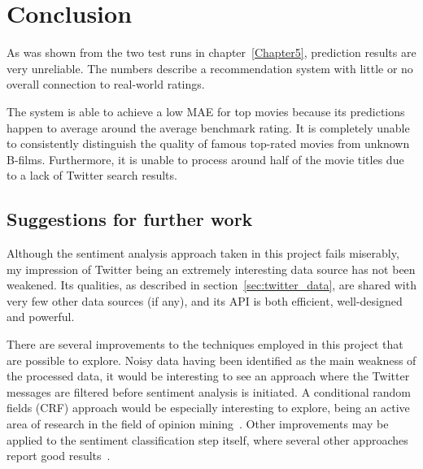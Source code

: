 
\chapter{Conclusion} %

\label{Chapter6}




As was shown from the two test runs in chapter~\ref{Chapter5}, prediction results are very unreliable. The numbers describe a recommendation system with little or no overall connection to real-world ratings.

The system is able to achieve a low MAE for top movies because its predictions happen to average around the average benchmark rating. It is completely unable to consistently distinguish the quality of famous top-rated movies from unknown B-films. Furthermore, it is unable to process around half of the movie titles due to a lack of Twitter search results.

\section{Suggestions for further work} %
\label{sec:suggestions_for_further_work}

Although the sentiment analysis approach taken in this project fails miserably, my impression of Twitter being an extremely interesting data source has not been weakened. Its qualities, as described in section~\ref{sec:twitter_data}, are shared with very few other data sources (if any), and its API is both efficient, well-designed and powerful.

There are several improvements to the techniques employed in this project that are possible to explore. Noisy data having been identified as the main weakness of the processed data, it would be interesting to see an approach where the Twitter messages are filtered before sentiment analysis is initiated. A conditional random fields (CRF) approach would be especially interesting to explore, being an active area of research in the field of opinion mining~\cite{Choi:2005:ISO:1220575.1220620, Jakob:2010:EOT:1870658.1870759, Yang:2012:EOE:2390948.2391100}. Other improvements may be applied to the sentiment classification step itself, where several other approaches report good results~\cite{agarwal2011sentiment, go2009twitterdistant, go2009twitter, kouloumpis2011twitter, pak2010twitter}.

